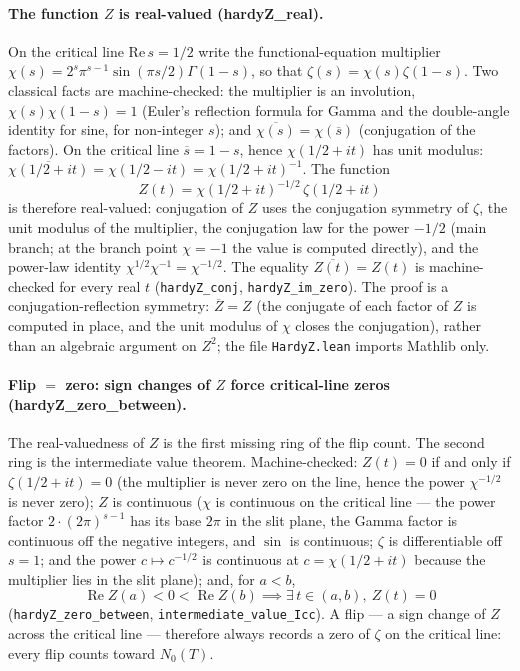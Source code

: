\documentclass[sigplan,10pt,anonymous,review]{acmart}
\begin{document}
\paragraph{The function $Z$ is real-valued (hardyZ\_real).} On the
critical line $\mathrm{Re}\,s = 1/2$ write the functional-equation
multiplier
$\chi(s) = 2^s\pi^{s-1}\sin(\pi s/2)\Gamma(1-s)$, so that
$\zeta(s) = \chi(s)\zeta(1-s)$. Two classical facts are
machine-checked: the multiplier is an involution,
$\chi(s)\chi(1-s) = 1$ (Euler's reflection formula for Gamma and the
double-angle identity for sine, for non-integer $s$); and
$\overline{\chi(s)} = \chi(\overline{s})$ (conjugation of the
factors). On the critical line $\overline{s} = 1-s$, hence
$\chi(1/2+it)$ has unit modulus:
$\overline{\chi(1/2+it)} = \chi(1/2-it) = \chi(1/2+it)^{-1}$. The
function
\begin{equation*}
  Z(t) = \chi(1/2+it)^{-1/2}\,\zeta(1/2+it)
\end{equation*}
is therefore real-valued: conjugation of $Z$ uses the conjugation
symmetry of $\zeta$, the unit modulus of the multiplier, the
conjugation law for the power $-1/2$ (main branch; at the branch
point $\chi = -1$ the value is computed directly), and the power-law
identity $\chi^{1/2}\chi^{-1} = \chi^{-1/2}$. The equality
$\overline{Z(t)} = Z(t)$ is machine-checked for every real $t$
(\texttt{hardyZ\_conj}, \texttt{hardyZ\_im\_zero}). The proof is a
conjugation-reflection symmetry: $\overline{Z} = Z$ (the conjugate
of each factor of $Z$ is computed in place, and the unit modulus of
$\chi$ closes the conjugation), rather than an algebraic argument on
$Z^2$; the file \texttt{HardyZ.lean} imports Mathlib only.

\paragraph{Flip $=$ zero: sign changes of $Z$ force critical-line
zeros (hardyZ\_zero\_between).} The real-valuedness of $Z$ is the
first missing ring of the flip count. The second ring is the
intermediate value theorem. Machine-checked: $Z(t) = 0$ if and only
if $\zeta(1/2+it) = 0$ (the multiplier is never zero on the line,
hence the power $\chi^{-1/2}$ is never zero); $Z$ is continuous
($\chi$ is continuous on the critical line --- the power factor
$2\cdot(2\pi)^{s-1}$ has its base $2\pi$ in the slit plane, the
Gamma factor is continuous off the negative integers, and $\sin$ is
continuous; $\zeta$ is differentiable off $s=1$; and the power
$c\mapsto c^{-1/2}$ is continuous at $c=\chi(1/2+it)$ because the
multiplier lies in the slit plane); and, for $a<b$,
\[
\operatorname{Re}Z(a)<0<\operatorname{Re}Z(b)
\implies \exists\,t\in(a,b),\ Z(t)=0
\]
(\texttt{hardyZ\_zero\_between}, \texttt{intermediate\_value\_Icc}).
A flip --- a sign change of $Z$ across the critical line --- therefore
always records a zero of $\zeta$ on the critical line: every flip
counts toward $N_0(T)$.
\end{document}

